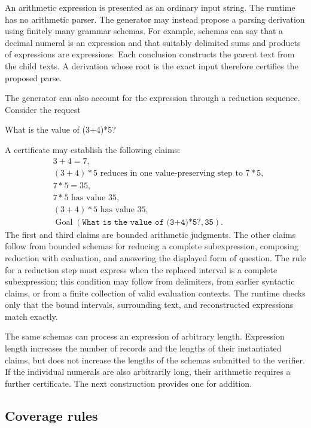 \documentclass[11pt,twoside]{article}
\theoremstyle{definition}
\newcommand{\Goal}{\operatorname{Goal}}
\begin{document}
An arithmetic expression is presented as an ordinary input string. The
runtime has no arithmetic parser. The generator may instead propose a parsing
derivation using finitely many grammar schemas. For example, schemas can say
that a decimal numeral is an expression and that suitably delimited sums and
products of expressions are expressions. Each conclusion constructs the
parent text from the child texts. A derivation whose root is the exact input
therefore certifies the proposed parse.

The generator can also account for the expression through a reduction
sequence. Consider the request
\begin{code}
What is the value of (3+4)*5?
\end{code}
A certificate may establish the following claims:
\begin{align*}
 &3+4=7,\\
 &(3+4)*5\text{ reduces in one value-preserving step to }7*5,\\
 &7*5=35,\\
 &7*5\text{ has value }35,\\
 &(3+4)*5\text{ has value }35,\\
 &\Goal(\texttt{What is the value of (3+4)*5?},\texttt{35}).
\end{align*}
The first and third claims are bounded arithmetic judgments. The other claims
follow from bounded schemas for reducing a complete subexpression, composing
reduction with evaluation, and answering the displayed form of question. The
rule for a reduction step must express when the replaced interval is a
complete subexpression; this condition may follow from delimiters, from
earlier syntactic claims, or from a finite collection of valid evaluation
contexts. The runtime checks only that the bound intervals, surrounding text,
and reconstructed expressions match exactly.

The same schemas can process an expression of arbitrary length. Expression
length increases the number of records and the lengths of their instantiated
claims, but does not increase the lengths of the schemas submitted to the
verifier. If the individual numerals are also arbitrarily long, their
arithmetic requires a further certificate. The next construction provides
one for addition.

\subsection{Coverage rules}
\end{document}
